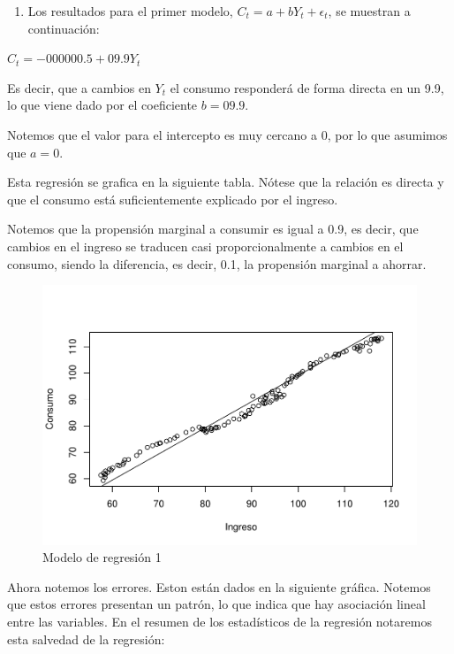 \documentclass[
]{article}
\providecommand{\tightlist}{%
  \setlength{\itemsep}{0pt}\setlength{\parskip}{0pt}}
\begin{document}
\begin{enumerate}
\def\labelenumi{\arabic{enumi}.}
\tightlist
\item
  Los resultados para el primer modelo, \(C_t=a + bY_t+\epsilon_t\), se
  muestran a continuación:
\end{enumerate}

\(C_t=-000000.5+09.9Y_t\)

Es decir, que a cambios en \(Y_t\) el consumo responderá de forma
directa en un 9.9, lo que viene dado por el coeficiente \(b=09.9\).

Notemos que el valor para el intercepto es muy cercano a 0, por lo que
asumimos que \(a=0\).

Esta regresión se grafica en la siguiente tabla. Nótese que la relación
es directa y que el consumo está suficientemente explicado por el
ingreso.

Notemos que la propensión marginal a consumir es igual a 0.9, es decir,
que cambios en el ingreso se traducen casi proporcionalmente a cambios
en el consumo, siendo la diferencia, es decir, 0.1, la propensión
marginal a ahorrar.

\begin{figure}
\centering
\includegraphics{Ejercicio-3_files/figure-latex/unnamed-chunk-12-1.pdf}
\caption{Modelo de regresión 1}
\end{figure}

Ahora notemos los errores. Eston están dados en la siguiente gráfica.
Notemos que estos errores presentan un patrón, lo que indica que hay
asociación lineal entre las variables. En el resumen de los estadísticos
de la regresión notaremos esta salvedad de la regresión:
\end{document}
